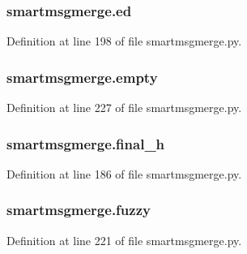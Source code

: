 \subsubsection[{\texorpdfstring{ed}{ed}}]{\setlength{\rightskip}{0pt plus 5cm}smartmsgmerge.\+ed}\hypertarget{namespacesmartmsgmerge_a36d32c09e60cee8d8327542fda09faf3}{}\label{namespacesmartmsgmerge_a36d32c09e60cee8d8327542fda09faf3}


Definition at line 198 of file smartmsgmerge.\+py.

\subsubsection[{\texorpdfstring{empty}{empty}}]{\setlength{\rightskip}{0pt plus 5cm}smartmsgmerge.\+empty}\hypertarget{namespacesmartmsgmerge_ac2680eb7fa9c45a71b644e17efafadd9}{}\label{namespacesmartmsgmerge_ac2680eb7fa9c45a71b644e17efafadd9}


Definition at line 227 of file smartmsgmerge.\+py.

\subsubsection[{\texorpdfstring{final\+\_\+h}{final_h}}]{\setlength{\rightskip}{0pt plus 5cm}smartmsgmerge.\+final\+\_\+h}\hypertarget{namespacesmartmsgmerge_ad6017716215ed97b68d46470b8bb3b8b}{}\label{namespacesmartmsgmerge_ad6017716215ed97b68d46470b8bb3b8b}


Definition at line 186 of file smartmsgmerge.\+py.

\subsubsection[{\texorpdfstring{fuzzy}{fuzzy}}]{\setlength{\rightskip}{0pt plus 5cm}smartmsgmerge.\+fuzzy}\hypertarget{namespacesmartmsgmerge_ad2ebdcbec75bdcb77dfbd97ce47296f7}{}\label{namespacesmartmsgmerge_ad2ebdcbec75bdcb77dfbd97ce47296f7}


Definition at line 221 of file smartmsgmerge.\+py.

